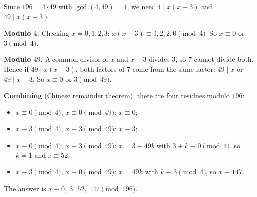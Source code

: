 Since $196=4\cdot49$ with $\gcd(4,49)=1$, we need $4\mid x(x-3)$ and $49\mid x(x-3)$.

\textbf{Modulo $4$.} Checking $x=0,1,2,3$: $x(x-3)\equiv0,2,2,0\pmod4$. So $x\equiv0$ or $3\pmod4$.

\textbf{Modulo $49$.} A common divisor of $x$ and $x-3$ divides $3$, so $7$ cannot divide both. Hence if $49\mid x(x-3)$, both factors of $7$ come from the same factor: $49\mid x$ or $49\mid x-3$. So $x\equiv0$ or $3\pmod{49}$.

\textbf{Combining} (Chinese remainder theorem), there are four residues modulo $196$:
\begin{itemize}
\item $x\equiv0\pmod4$, $x\equiv0\pmod{49}$: $x\equiv0$;
\item $x\equiv3\pmod4$, $x\equiv3\pmod{49}$: $x\equiv3$;
\item $x\equiv0\pmod4$, $x\equiv3\pmod{49}$: $x=3+49k$ with $3+k\equiv0\pmod4$, so $k=1$ and $x\equiv52$;
\item $x\equiv3\pmod4$, $x\equiv0\pmod{49}$: $x=49k$ with $k\equiv3\pmod4$, so $x\equiv147$.
\end{itemize}
The answer is $\boxed{x\equiv0,\ 3,\ 52,\ 147\pmod{196}}$.
